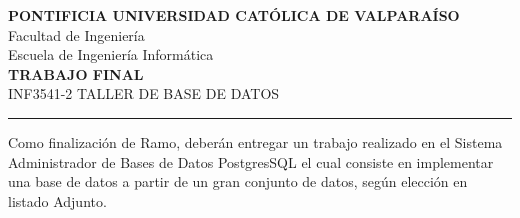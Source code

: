 \documentclass[11pt,a4paper]{article}
\begin{document}
\begin{center}
    {\large\bfseries PONTIFICIA UNIVERSIDAD CATÓLICA DE VALPARAÍSO}\\[0.3em]
    Facultad de Ingeniería\\[0.2em]
    Escuela de Ingeniería Informática\\[1.2em]
    {\Large\bfseries TRABAJO FINAL}\\[0.4em]
    INF3541-2 \quad TALLER DE BASE DE DATOS
\end{center}

\vspace{0.4em}
\hrule
\vspace{1em}

Como finalización de Ramo, deberán entregar un trabajo realizado en el Sistema
Administrador de Bases de Datos PostgresSQL el cual consiste en implementar una
base de datos a partir de un gran conjunto de datos, según elección en listado
Adjunto.
\end{document}
